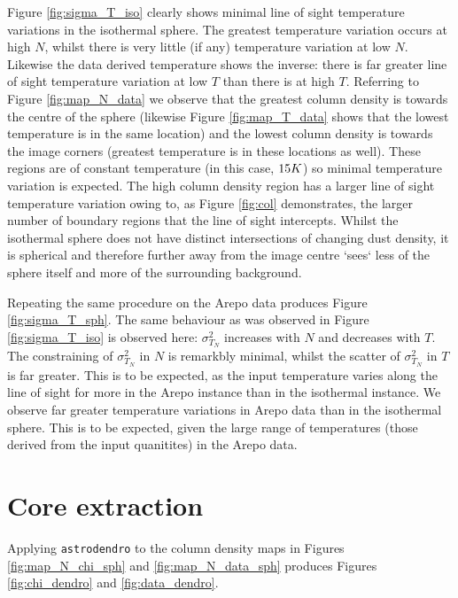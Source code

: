 \documentclass{report}
\begin{document}
Figure \ref{fig:sigma_T_iso} clearly shows minimal line of sight temperature variations in the isothermal sphere. The greatest temperature variation occurs at high $N$, whilst there is very little (if any) temperature variation at low $N$. Likewise the data derived temperature shows the inverse: there is far greater line of sight temperature variation at low $T$ than there is at high $T$. Referring to Figure \ref{fig:map_N_data} we observe that the greatest column density is towards the centre of the sphere (likewise Figure \ref{fig:map_T_data} shows that the lowest temperature is in the same location) and the lowest column density is towards the image corners (greatest temperature is in these locations as well). These regions are of constant temperature (in this case, $15\/K$) so minimal temperature variation is expected. The high column density region has a larger line of sight temperature variation owing to, as Figure \ref{fig:col} demonstrates, the larger number of boundary regions that the line of sight intercepts. Whilst the isothermal sphere does not have distinct intersections of changing dust density, it is spherical and therefore further away from the image centre `sees` less of the sphere itself and more of the surrounding background.

Repeating the same procedure on the Arepo data produces Figure \ref{fig:sigma_T_sph}. The same behaviour as was observed in Figure \ref{fig:sigma_T_iso} is observed here: $\sigma_{T_{N}}^{2}$ increases with $N$ and decreases with $T$. The constraining of $\sigma_{T_{N}}^{2}$ in $N$ is remarkbly minimal, whilst the scatter of
$\sigma_{T_{N}}^{2}$ in $T$ is far greater. This is to be expected, as the input temperature varies along the line of sight for more in the Arepo instance than in the isothermal instance. We observe far greater temperature variations in Arepo data than in the isothermal sphere. This is to be expected, given the large range of temperatures (those derived from the input quanitites) in the Arepo data.

\section{Core extraction}
Applying \texttt{astrodendro} to the column density maps in Figures \ref{fig:map_N_chi_sph} and \ref{fig:map_N_data_sph} produces Figures \ref{fig:chi_dendro} and \ref{fig:data_dendro}.
\end{document}
